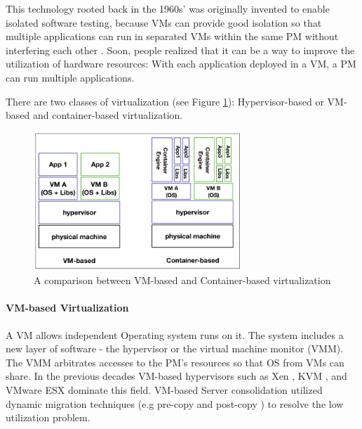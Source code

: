  This technology rooted back in the 1960s' was originally invented to enable isolated software testing, because VMs can provide good isolation so that multiple applications can run in separated VMs within the same PM without interfering each other \cite{Somani:2009ho}. Soon, people realized that it can be a way to improve the utilization of hardware resources: With each application deployed in a VM, a PM can run multiple applications. 


There are two classes of virtualization (see Figure \ref{fig:comparison}): Hypervisor-based or VM-based and container-based virtualization.

\begin{figure}
	\centering
	\includegraphics[width=0.7\textwidth]{pics/comparison.png}
	\caption{A comparison between VM-based and Container-based virtualization \cite{Piraghaj:2016bw}}
	\label{fig:comparison}
\end{figure}

\paragraph{VM-based Virtualization} 

 A VM allows independent Operating system runs on it. The system includes a new layer of software - the hypervisor or the virtual machine monitor (VMM). The VMM arbitrates accesses to the PM's resources so that OS from VMs can share. In the previous decades VM-based hypervisors such as Xen \cite{Barham:2003cj}, KVM \cite{Kivity:2007wu}, and VMware ESX \cite{Waldspurger:2002db} dominate this field. VM-based Server consolidation \cite{Zhang:2010vo} utilized dynamic migration techniques (e.g pre-copy \cite{Clark:2005ud} and post-copy \cite{Hines:2009fv}) to resolve the low utilization problem.

